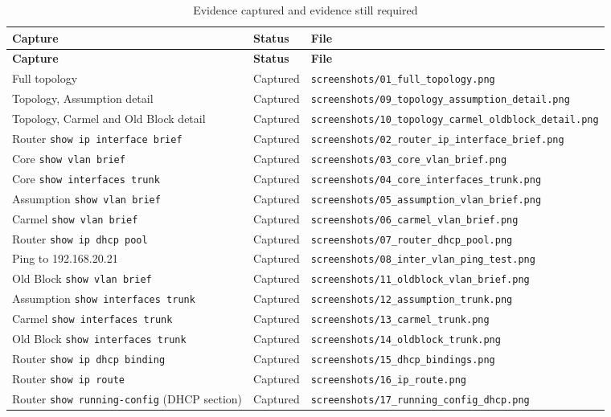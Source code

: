 \documentclass[11pt,a4paper]{article}
\newcommand{\shot}[1]{\texttt{\footnotesize screenshots/}\newline\texttt{\footnotesize #1}}
\begin{document}
\small
\begin{longtable}{@{}L{0.36\textwidth} L{0.14\textwidth} L{0.44\textwidth}@{}}
\caption{Evidence captured and evidence still required}\label{tab:evidence}\\
\toprule
\textbf{Capture} & \textbf{Status} & \textbf{File} \\
\midrule
\endfirsthead
\toprule
\textbf{Capture} & \textbf{Status} & \textbf{File} \\
\midrule
\endhead
Full topology & Captured & \shot{01\_full\_topology.png} \\
Topology, Assumption detail & Captured & \shot{09\_topology\_assumption\_detail.png} \\
Topology, Carmel and Old Block detail & Captured & \shot{10\_topology\_carmel\_oldblock\_detail.png} \\
Router \texttt{show ip interface brief} & Captured & \shot{02\_router\_ip\_interface\_brief.png} \\
Core \texttt{show vlan brief} & Captured & \shot{03\_core\_vlan\_brief.png} \\
Core \texttt{show interfaces trunk} & Captured & \shot{04\_core\_interfaces\_trunk.png} \\
Assumption \texttt{show vlan brief} & Captured & \shot{05\_assumption\_vlan\_brief.png} \\
Carmel \texttt{show vlan brief} & Captured & \shot{06\_carmel\_vlan\_brief.png} \\
Router \texttt{show ip dhcp pool} & Captured & \shot{07\_router\_dhcp\_pool.png} \\
Ping to 192.168.20.21 & Captured & \shot{08\_inter\_vlan\_ping\_test.png} \\
Old Block \texttt{show vlan brief} & Captured & \shot{11\_oldblock\_vlan\_brief.png} \\
Assumption \texttt{show interfaces trunk} & Captured & \shot{12\_assumption\_trunk.png} \\
Carmel \texttt{show interfaces trunk} & Captured & \shot{13\_carmel\_trunk.png} \\
Old Block \texttt{show interfaces trunk} & Captured & \shot{14\_oldblock\_trunk.png} \\
Router \texttt{show ip dhcp binding} & Captured & \shot{15\_dhcp\_bindings.png} \\
Router \texttt{show ip route} & Captured & \shot{16\_ip\_route.png} \\
Router \texttt{show running-config} (DHCP section) & Captured & \shot{17\_running\_config\_dhcp.png} \\

\end{longtable}
\end{document}
